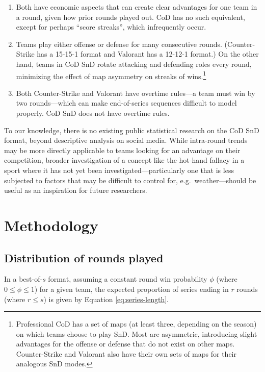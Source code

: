 \documentclass{article}
\providecommand{\tightlist}{%
  \setlength{\itemsep}{0pt}\setlength{\parskip}{0pt}}
\begin{document}
\begin{enumerate}
\def\labelenumi{\arabic{enumi}.}
\tightlist
\item
  Both have economic aspects that can create clear advantages for one
  team in a round, given how prior rounds played out. CoD has no such
  equivalent, except for perhaps ``score streaks'', which infrequently
  occur.
\item
  Teams play either offense or defense for many consecutive rounds.
  (Counter-Strike has a 15-15-1 format and Valorant has a 12-12-1
  format.) On the other hand, teams in CoD SnD rotate attacking and
  defending roles every round, minimizing the effect of map asymmetry on
  streaks of wins.\footnote{Professional CoD has a set of maps (at least
    three, depending on the season) on which teams choose to play SnD.
    Most are asymmetric, introducing slight advantages for the offense
    or defense that do not exist on other maps. Counter-Strike and
    Valorant also have their own sets of maps for their analogous SnD
    modes.}
\item
  Both Counter-Strike and Valorant have overtime rules---a team must win
  by two rounds---which can make end-of-series sequences difficult to
  model properly. CoD SnD does not have overtime rules.
\end{enumerate}

To our knowledge, there is no existing public statistical research on
the CoD SnD format, beyond descriptive analysis on social media. While
intra-round trends may be more directly applicable to teams looking for
an advantage on their competition, broader investigation of a concept
like the hot-hand fallacy in a sport where it has not yet been
investigated---particularly one that is less subjected to factors that
may be difficult to control for, e.g.~weather---should be useful as an
inspiration for future researchers.

\hypertarget{methodology}{%
\section{Methodology}\label{methodology}}

\hypertarget{distribution-of-rounds-played}{%
\subsection{Distribution of rounds
played}\label{distribution-of-rounds-played}}

In a best-of-\(s\) format, assuming a constant round win probability
\(\phi\) (where \(0 \leq \phi \leq 1\)) for a given team, the expected
proportion of series ending in \(r\) rounds (where \(r \leq s\)) is
given by Equation \ref{eq:series-length}.
\end{document}
